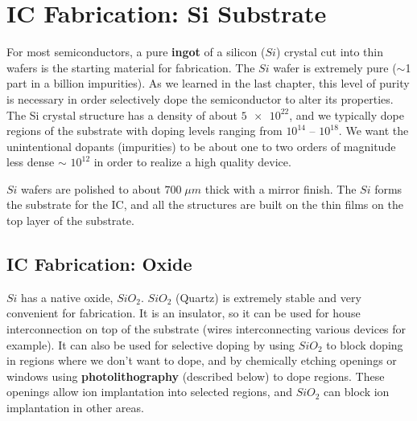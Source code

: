 \section{IC Fabrication: Si Substrate}
For most semiconductors, a pure \textbf{ingot} of a silicon ($Si$) crystal cut into thin wafers is the starting material for fabrication.  The $Si$ wafer is extremely pure ($\sim$1 part in a billion impurities).  As we learned in the last chapter, this level of purity is necessary in order selectively dope the semiconductor to alter its properties.  The Si crystal structure has a density of about $\num{5e22}$, and we typically dope regions of the substrate with doping levels ranging from  $10^{14}$ – $10^{18}$.  We want the unintentional dopants (impurities) to be about one to two orders of magnitude less dense $\sim$ $10^{12}$ in order to realize a high quality device.  

$Si$ wafers are polished to about $700\;\mu m$ thick with a mirror finish.  The $Si$ forms the substrate for the IC, and all the structures are built on the thin films on the top layer of the substrate.  
\subsection{IC Fabrication: Oxide}
$Si$ has a native oxide, $SiO_2$.  $SiO_2$ (Quartz) is extremely stable and very convenient for fabrication.  It is an insulator, so it can be used for house interconnection on top of the substrate (wires interconnecting various devices for example).  It can also be used for selective doping by using $SiO_2$ to block doping in regions where we don't want to dope, and by chemically etching openings or windows using \textbf{photolithography} (described below) to dope regions.  These openings allow ion implantation into selected regions, and $SiO_2$ can block ion implantation in other areas.
